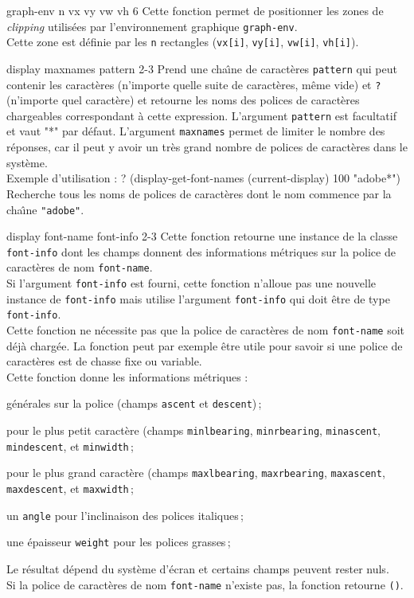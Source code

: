  {graph-env n vx vy vw vh} {6}
Cette fonction permet de positionner les zones de {\em clipping}
utilis\'{e}es par  l'environnement graphique {\tt graph-env}.\\
Cette zone est d\'{e}finie par les {\tt n} rectangles ({\tt vx[i]}, {\tt vy[i]},
{\tt vw[i]}, {\tt vh[i]}).


\EndHide


 {display maxnames pattern} {2-3}
Prend une cha\^{\i}ne de caract\`{e}res {\tt pattern} qui peut contenir les
caract\`{e}res {\tt *} (n'importe quelle suite de caract\`{e}res, m\^{e}me vide) et
{\tt ?} (n'importe quel caract\`{e}re) et retourne les noms des polices de
caract\`{e}res chargeables correspondant \`{a} cette expression.
L'argument {\tt pattern} est facultatif et vaut "*" par d\'{e}faut.
L'argument {\tt maxnames} permet de limiter le nombre des r\'{e}ponses,
car il peut y avoir un tr\`{e}s grand nombre de polices de caract\`{e}res dans le
syst\`{e}me.\\
Exemple d'utilisation :
\BeginLL
? (display-get-font-names (current-display) 100 "adobe*")
\EndLL
Recherche tous les noms de polices de caract\`{e}res
dont le nom commence par la cha\^{\i}ne {\tt "adobe"}.


 {display font-name font-info} {2-3}
Cette fonction retourne une instance de la classe {\tt font-info} dont les
champs donnent des informations m\'{e}triques sur la police de caract\`{e}res de nom
{\tt font-name}.\\
Si l'argument {\tt font-info} est fourni, cette fonction n'alloue pas une
nouvelle instance de {\tt font-info} mais utilise l'argument {\tt font-info}
qui doit  \^{e}tre de type {\tt font-info}.\\
Cette fonction ne n\'{e}cessite pas que la police de caract\`{e}res de nom
{\tt font-name} soit d\'{e}j\`{a} charg\'{e}e.
La fonction peut par exemple \^{e}tre utile pour savoir si une police
de caract\`{e}res est de chasse fixe ou variable.\\
Cette fonction donne les informations m\'{e}triques :
\begin{Itemize}
\item g\'{e}n\'{e}rales sur la police (champs {\tt ascent} et {\tt descent})\,;
\item pour le plus petit caract\`{e}re (champs {\tt minlbearing},
{\tt minrbearing}, {\tt minascent}, {\tt mindescent}, et {\tt minwidth}\,;
\item pour le plus grand caract\`{e}re (champs {\tt maxlbearing},
{\tt maxrbearing}, {\tt maxascent}, {\tt maxdescent}, et {\tt maxwidth}\,;
\item un {\tt angle} pour l'inclinaison des polices italiques\,;
\item une \'{e}paisseur {\tt weight} pour les polices grasses\,;
\end{Itemize}
Le r\'{e}sultat d\'{e}pend du syst\`{e}me d'\'{e}cran et certains champs peuvent rester
nuls.\\
Si la police de caract\`{e}res de nom {\tt font-name} n'existe pas, la fonction
retourne {\tt ()}.



